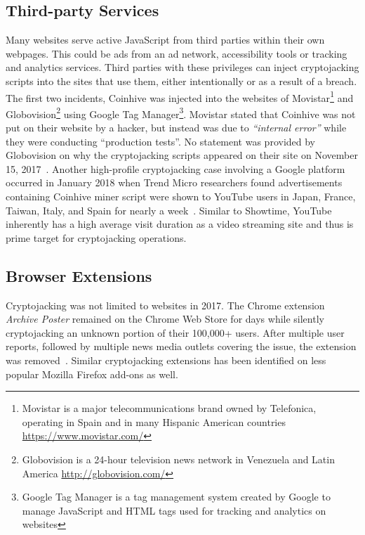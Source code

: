 \subsection{Third-party Services} 

Many websites serve active JavaScript from third parties within their own webpages. This could be ads from an ad network, accessibility tools or tracking and analytics services. Third parties with these privileges can inject cryptojacking scripts into the sites that use them, either intentionally or as a result of a breach. The first two incidents, Coinhive was injected into the websites of Movistar\footnote{Movistar is a major telecommunications brand owned by Telefonica, operating in Spain and in many Hispanic American countries \url{https://www.movistar.com/}} and Globovision\footnote{Globovision is a 24-hour television news network in Venezuela and Latin America \url{http://globovision.com/}} using Google Tag Manager\footnote{Google Tag Manager is a tag management system created by Google to manage JavaScript and HTML tags used for tracking and analytics on websites}. Movistar stated that Coinhive was not put on their website by a hacker, but instead was due to \textit{``internal error''} while they were conducting ``production tests''. No statement was provided by Globovision on why the cryptojacking scripts appeared on their site on November 15, 2017~\cite{googletagcoinhive}. Another high-profile cryptojacking case involving a Google platform occurred in January 2018 when Trend Micro researchers found advertisements containing Coinhive miner script were shown to YouTube users in Japan, France, Taiwan, Italy, and Spain for nearly a week~\cite{trendmicrocoinhive}. Similar to Showtime, YouTube inherently has a high average visit duration as a video streaming site and thus is prime target for cryptojacking operations.


\subsection{Browser Extensions} 

Cryptojacking was not limited to websites in 2017. The Chrome extension \textit{Archive Poster} remained on the Chrome Web Store for days while silently cryptojacking an unknown portion of their 100,000+ users. After multiple user reports, followed by multiple news media outlets covering the issue, the extension was removed~\cite{chromeextentioncoinhive}. Similar cryptojacking extensions has been identified on less popular Mozilla Firefox add-ons as well. 


